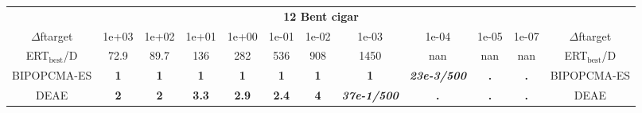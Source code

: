 \begin{tabular}{cccccccccccc}
 & \multicolumn{10}{c}{{\normalsize \textbf{12 Bent cigar}}}\\
$\Delta$ftarget& 1e+03& 1e+02& 1e+01& 1e+00& 1e-01& 1e-02& 1e-03& 1e-04& 1e-05& 1e-07 & $\Delta$ftarget \\
ERT$_{\textrm{best}}$/D& 72.9& 89.7& 136& 282& 536& 908& 1450& nan& nan& nan & ERT$_{\textrm{best}}$/D \\
\hline
BIPOPCMA-ES & \textbf{1} & \textbf{1} & \textbf{1} & \textbf{1} & \textbf{1} & \textbf{1} & \textbf{1} & \textbf{\textit{23e-3}\textit{/500}} & \textbf{.} & \textbf{.} & BIPOPCMA-ES \cite{add_an_entry_for_BIPOPCMA-ES_in_bbob.bib}\\
DEAE & \textbf{2} & \textbf{2} & \textbf{3.3} & \textbf{2.9} & \textbf{2.4} & \textbf{4} & \textbf{\textit{37e-1}\textit{/500}} & \textbf{.} & \textbf{.} & \textbf{.} & DEAE \cite{add_an_entry_for_DEAE_in_bbob.bib}
\end{tabular}

